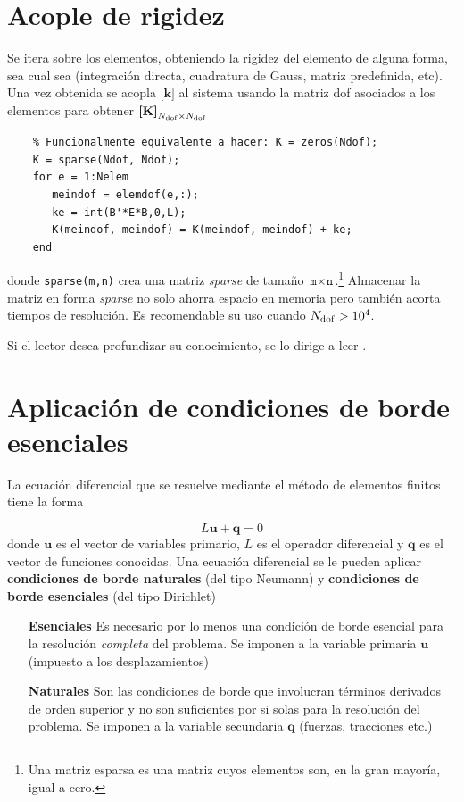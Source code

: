 \documentclass[11pt, a4paper,titlepage]{article}
\newcommand{\Mme}[1]{\boldsymbol{[}\mathbf{#1} \boldsymbol{]}}
\newcommand{\MK}{\Mme{K}}
\newcommand{\Mk}{\Mme{k}}
\begin{document}
\section{Acople de rigidez}
Se itera sobre los elementos, obteniendo la rigidez del elemento de alguna forma, sea cual sea (integración directa, cuadratura de Gauss, matriz predefinida, etc). Una vez obtenida se acopla $\Mk$ al sistema usando la matriz dof asociados a los elementos para obtener $\MK_{\Ndof \times \Ndof}$

\begin{verbatim}
    % Funcionalmente equivalente a hacer: K = zeros(Ndof);
    K = sparse(Ndof, Ndof); 
    for e = 1:Nelem
       meindof = elemdof(e,:);
       ke = int(B'*E*B,0,L);
       K(meindof, meindof) = K(meindof, meindof) + ke;
    end
\end{verbatim}
donde \texttt{sparse(m,n)} crea una matriz \textit{sparse} de tamaño $\texttt{m}\times\texttt{n}$.\footnote{Una matriz esparsa es una matriz cuyos elementos son, en la gran mayoría, igual a cero.} Almacenar la matriz en forma \textit{sparse} no solo ahorra espacio en memoria pero también acorta tiempos de resolución. Es recomendable su uso cuando $N_{\mathrm{dof}}>10^4$.

Si el lector desea profundizar su conocimiento, se lo dirige a leer \citet{chessa2002programing}.


\section{Aplicación de condiciones de borde esenciales} \label{sec:condBordeEsenciales}
La ecuación diferencial que se resuelve mediante el método de elementos finitos tiene la forma

\begin{equation}  \label{eq:condBordeGeneralizada}
L\mathbf{u}+\mathbf{q}=0
\end{equation}
donde $\mathbf{u}$ es el vector de variables primario, $L$ es el operador diferencial y $\mathbf{q}$ es el vector de funciones conocidas. Una ecuación diferencial se le pueden aplicar \textbf{condiciones de borde naturales} (del tipo Neumann) y \textbf{condiciones de borde esenciales} (del tipo Dirichlet) \citep{dixit2007finite}
\begin{enumerate}
	\item[\textbf{Esenciales}] Es necesario por lo menos una condición de borde esencial para la resolución \textit{completa} del problema. Se imponen a la variable primaria $\mathbf{u}$ (impuesto a los desplazamientos)
	\item[\textbf{Naturales}] Son las condiciones de borde que involucran términos derivados de orden superior y no son suficientes por si solas para la resolución del problema. Se imponen a la variable secundaria $\mathbf{q}$ (fuerzas, tracciones etc.)
\end{enumerate}
\end{document}
